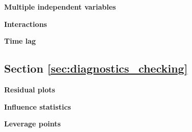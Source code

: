 \begin{exercise}
\label{ex:modelling_mod.1}

\textbf{Multiple independent variables }



\end{exercise}

\begin{exercise}
\label{ex:interactions}

\textbf{Interactions}





\end{exercise}

\begin{exercise}
\label{ex:cross_correlation_function}  

\textbf{Time lag}



\end{exercise}

\subsection{Section \ref{sec:diagnostics_checking}}

\begin{exercise}
\label{ex:residual_plots}

\textbf{Residual plots}



\end{exercise}

\begin{exercise}
\label{ex:influence_statistics}

\textbf{Influence statistics}



\end{exercise}

\begin{exercise}
\label{ex:leverage_points}

\textbf{Leverage points}





\end{exercise}

